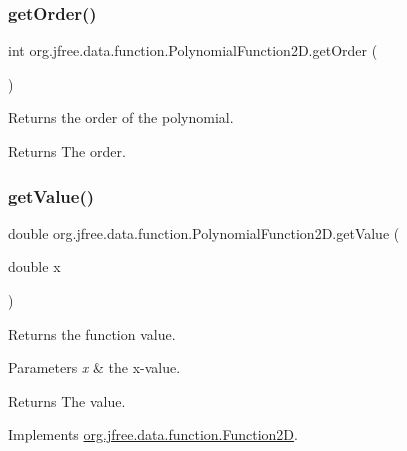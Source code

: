 \subsubsection{\texorpdfstring{get\+Order()}{getOrder()}}
{\footnotesize\ttfamily int org.\+jfree.\+data.\+function.\+Polynomial\+Function2\+D.\+get\+Order (\begin{DoxyParamCaption}{ }\end{DoxyParamCaption})}

Returns the order of the polynomial.

\begin{DoxyReturn}{Returns}
The order. 
\end{DoxyReturn}
\mbox{\label{classorg_1_1jfree_1_1data_1_1function_1_1_polynomial_function2_d_a636f8ebc39c8d62299e4a8d5a5325c14}} 
\subsubsection{\texorpdfstring{get\+Value()}{getValue()}}
{\footnotesize\ttfamily double org.\+jfree.\+data.\+function.\+Polynomial\+Function2\+D.\+get\+Value (\begin{DoxyParamCaption}\item[{double}]{x }\end{DoxyParamCaption})}

Returns the function value.


\begin{DoxyParams}{Parameters}
{\em x} & the x-\/value.\\
\hline
\end{DoxyParams}
\begin{DoxyReturn}{Returns}
The value. 
\end{DoxyReturn}


Implements \mbox{\hyperlink{interfaceorg_1_1jfree_1_1data_1_1function_1_1_function2_d_a0f925a1dfe40f894d7f763f39320db22}{org.\+jfree.\+data.\+function.\+Function2D}}.

\mbox{\label{classorg_1_1jfree_1_1data_1_1function_1_1_polynomial_function2_d_a328ffb36a5eb706c784752675e837f04}} 
